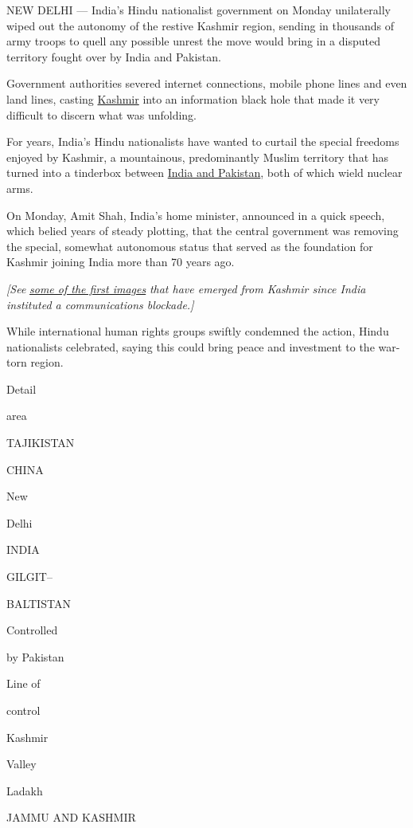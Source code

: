 NEW DELHI --- India's Hindu nationalist government on Monday
unilaterally wiped out the autonomy of the restive Kashmir region,
sending in thousands of army troops to quell any possible unrest the
move would bring in a disputed territory fought over by India and
Pakistan.

Government authorities severed internet connections, mobile phone lines
and even land lines, casting
\href{https://www.nytimes.com/2019/08/07/world/asia/pakistan-kashmir-india.html}{Kashmir}
into an information black hole that made it very difficult to discern
what was unfolding.

For years, India's Hindu nationalists have wanted to curtail the special
freedoms enjoyed by Kashmir, a mountainous, predominantly Muslim
territory that has turned into a tinderbox between
\href{https://www.nytimes.com/2019/08/07/world/asia/pakistan-kashmir-india.html}{India
and Pakistan}, both of which wield nuclear arms.

On Monday, Amit Shah, India's home minister, announced in a quick
speech, which belied years of steady plotting, that the central
government was removing the special, somewhat autonomous status that
served as the foundation for Kashmir joining India more than 70 years
ago.

\emph{{[}See}
\href{https://www.nytimes.com/2019/08/09/world/asia/kashmir-photos-india.html}{\emph{some
of the first images}} \emph{that have emerged from Kashmir since India
instituted a communications blockade.{]}}

While international human rights groups swiftly condemned the action,
Hindu nationalists celebrated, saying this could bring peace and
investment to the war-torn region.

Detail

area

TAJIKISTAN

CHINA

New

Delhi

INDIA

GILGIT--

BALTISTAN

Controlled

by Pakistan

Line of

control

Kashmir

Valley

Ladakh

JAMMU AND KASHMIR

